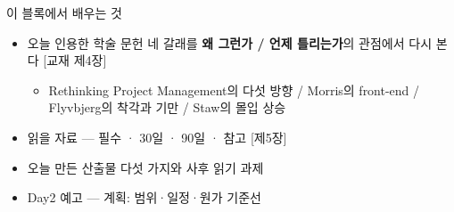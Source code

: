 \begin{frame}[allowframebreaks=1.0]{이 블록에서 배우는 것}
\small
\begin{itemize}
\item\relax 오늘 인용한 학술 문헌 네 갈래를 \textbf{왜 그런가 / 언제 틀리는가}의 관점에서 다시 본다 [교재 제4장]
\par\nobreak
\begin{itemize}
\item\relax Rethinking Project Management의 다섯 방향 / Morris의 front-end / Flyvbjerg의 착각과 기만 / Staw의 몰입 상승
\end{itemize}
\item\relax 읽을 자료 — 필수 · 30일 · 90일 · 참고 [제5장]
\item\relax 오늘 만든 산출물 다섯 가지와 사후 읽기 과제
\item\relax Day2 예고 — 계획: 범위·일정·원가 기준선
\end{itemize}
\end{frame}


